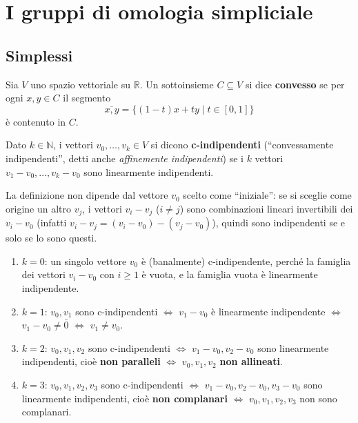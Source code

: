 \chapter{I gruppi di omologia simpliciale}

\section{Simplessi}

\begin{definicion}
Sia $V$ uno spazio vettoriale su $\mathbb{R}$. Un sottoinsieme $C \subseteq V$ si dice \textbf{convesso} se per ogni $x, y \in C$ il segmento
\[
\overline{x,y} = \{ (1-t)x + ty \mid t \in [0,1] \}
\]
\`e contenuto in $C$.
\end{definicion}

\begin{definicion}
Dato $k \in \mathbb{N}$, i vettori $v_0, \dots, v_k \in V$ si dicono \textbf{c-indipendenti} (``convessamente indipendenti'', detti anche \emph{affinemente indipendenti}) se i $k$ vettori $v_1 - v_0, \dots, v_k - v_0$ sono linearmente indipendenti.
\end{definicion}

\begin{observacion}
La definizione non dipende dal vettore $v_0$ scelto come ``iniziale'': se si sceglie come origine un altro $v_j$, i vettori $v_i - v_j$ ($i \neq j$) sono combinazioni lineari invertibili dei $v_i - v_0$ (infatti $v_i - v_j = (v_i - v_0) - (v_j - v_0)$), quindi sono indipendenti se e solo se lo sono questi.
\end{observacion}

\begin{ejemplo}
\begin{enumerate}
    \item $k = 0$: un singolo vettore $v_0$ \`e (banalmente) c-indipendente, perch\'e la famiglia dei vettori $v_i - v_0$ con $i \geqslant 1$ \`e vuota, e la famiglia vuota \`e linearmente indipendente.
    \item $k = 1$: $v_0, v_1$ sono c-indipendenti $\iff$ $v_1 - v_0$ \`e linearmente indipendente $\iff$ $v_1 - v_0 \neq \bar{0}$ $\iff$ $v_1 \neq v_0$.
    \item $k = 2$: $v_0, v_1, v_2$ sono c-indipendenti $\iff$ $v_1 - v_0, v_2 - v_0$ sono linearmente indipendenti, cio\`e \textbf{non paralleli} $\iff$ $v_0, v_1, v_2$ \textbf{non allineati}.
    \item $k = 3$: $v_0, v_1, v_2, v_3$ sono c-indipendenti $\iff$ $v_1 - v_0, v_2 - v_0, v_3 - v_0$ sono linearmente indipendenti, cio\`e \textbf{non complanari} $\iff$ $v_0, v_1, v_2, v_3$ non sono complanari.
\end{enumerate}
\end{ejemplo}

